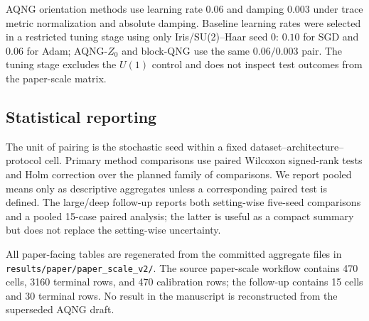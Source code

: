 AQNG orientation methods use learning rate $0.06$ and damping $0.003$ under trace metric normalization and absolute damping. Baseline learning rates were selected in a restricted tuning stage using only Iris/SU(2)--Haar seed 0: $0.10$ for SGD and $0.06$ for Adam; AQNG-$Z_0$ and block-QNG use the same $0.06/0.003$ pair. The tuning stage excludes the $U(1)$ control and does not inspect test outcomes from the paper-scale matrix.

\subsection{Statistical reporting}
The unit of pairing is the stochastic seed within a fixed dataset--architecture--protocol cell. Primary method comparisons use paired Wilcoxon signed-rank tests and Holm correction over the planned family of comparisons. We report pooled means only as descriptive aggregates unless a corresponding paired test is defined. The large/deep follow-up reports both setting-wise five-seed comparisons and a pooled 15-case paired analysis; the latter is useful as a compact summary but does not replace the setting-wise uncertainty.

All paper-facing tables are regenerated from the committed aggregate files in \texttt{results/paper/paper\_scale\_v2/}. The source paper-scale workflow contains 470 cells, 3160 terminal rows, and 470 calibration rows; the follow-up contains 15 cells and 30 terminal rows. No result in the manuscript is reconstructed from the superseded AQNG draft.
